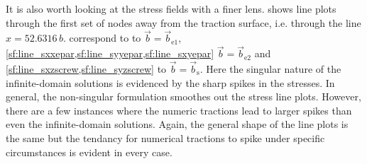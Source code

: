 \documentclass[11pt]{iopart}
\begin{document}
It is also worth looking at the stress fields with a finer lens.  shows line plots through the first set of nodes away from the traction surface, i.e. through the line $x = 52.6316\, b$.  correspond to to $\vec{b} = \vec{b}_{\textrm{e1}}$, \cref{sf:line_sxxepar,sf:line_syyepar,sf:line_sxyepar} $\vec{b} = \vec{b}_{\textrm{e2}}$ and \cref{sf:line_sxzscrew,sf:line_syzscrew} to $\vec{b} = \vec{b}_{\textrm{s}}$. Here the singular nature of the infinite-domain solutions is evidenced by the sharp spikes in the stresses. In general, the non-singular formulation smoothes out the stress line plots. However, there are a few instances where the numeric tractions lead to larger spikes than even the infinite-domain solutions. Again, the general shape of the line plots is the same but the tendancy for numerical tractions to spike under specific circumstances is evident in every case.
\end{document}
